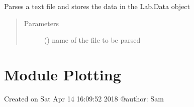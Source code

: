 \documentclass[letterpaper,10pt,english]{sphinxmanual}
\begin{document}

\begin{fulllineitems}
\label{\detokenize{data:data.parse_datafile}}
Parses a text file and stores the data in the Lab.Data object
\begin{quote}\begin{description}
\item[{Parameters}] \leavevmode
{} () \textendash{} name of the file to be parsed

\end{description}\end{quote}

\end{fulllineitems}



\chapter{Module Plotting}
\label{\detokenize{plotting:module-plotting}}\label{\detokenize{plotting:module-plotting}}\label{\detokenize{plotting::doc}}
Created on Sat Apr 14 16:09:52 2018
@author: Sam
\end{document}
